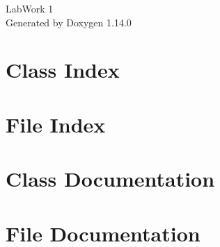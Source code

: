 \documentclass[twoside]{book}
\newcommand{\+}{\discretionary{\mbox{\scriptsize$\hookleftarrow$}}{}{}}
\newcommand{\clearemptydoublepage}{%
    \newpage{\pagestyle{empty}\cleardoublepage}%
  }
\begin{document}
  \raggedbottom
    \hypersetup{pageanchor=false,
                bookmarksnumbered=true,
                pdfencoding=unicode
               }
  \begin{titlepage}
  \vspace*{7cm}
  \begin{center}%
  {\Large Lab\+Work 1}\\
  \vspace*{1cm}
  {\large Generated by Doxygen 1.14.0}\\
  \end{center}
  \end{titlepage}
  \clearemptydoublepage
  \tableofcontents
  \clearemptydoublepage
  \hypersetup{pageanchor=true}

\chapter{Class Index}

\chapter{File Index}

\chapter{Class Documentation}





\chapter{File Documentation}




  \backmatter
  \newpage
  \clearemptydoublepage
  \printindex
\end{document}

